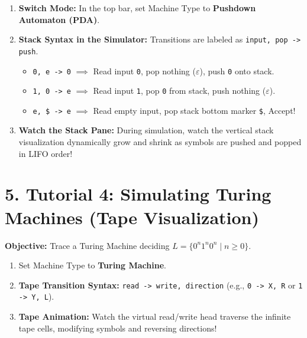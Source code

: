 \documentclass[11pt,a4paper]{article}
\begin{document}
\begin{enumerate}[leftmargin=1.5em, itemsep=4pt]
    \item \textbf{Switch Mode:} In the top bar, set Machine Type to \textbf{Pushdown Automaton (PDA)}.
    \item \textbf{Stack Syntax in the Simulator:} Transitions are labeled as \texttt{input, pop -> push}.
    \begin{itemize}
        \item \texttt{0, e -> 0} $\implies$ Read input \texttt{0}, pop nothing ($\varepsilon$), push \texttt{0} onto stack.
        \item \texttt{1, 0 -> e} $\implies$ Read input \texttt{1}, pop \texttt{0} from stack, push nothing ($\varepsilon$).
        \item \texttt{e, \$ -> e} $\implies$ Read empty input, pop stack bottom marker \texttt{\$}, Accept!
    \end{itemize}
    \item \textbf{Watch the Stack Pane:} During simulation, watch the vertical stack visualization dynamically grow and shrink as symbols are pushed and popped in LIFO order!
\end{enumerate}

\vspace{8pt}

\section*{5. Tutorial 4: Simulating Turing Machines (Tape Visualization)}
\textbf{Objective:} Trace a Turing Machine deciding $L = \{0^n 1^n 0^n \mid n \ge 0\}$.

\begin{enumerate}[leftmargin=1.5em, itemsep=4pt]
    \item Set Machine Type to \textbf{Turing Machine}.
    \item \textbf{Tape Transition Syntax:} \texttt{read -> write, direction} (e.g., \texttt{0 -> X, R} or \texttt{1 -> Y, L}).
    \item \textbf{Tape Animation:} Watch the virtual read/write head traverse the infinite tape cells, modifying symbols and reversing directions!
\end{enumerate}

\vspace{8pt}
\end{document}
